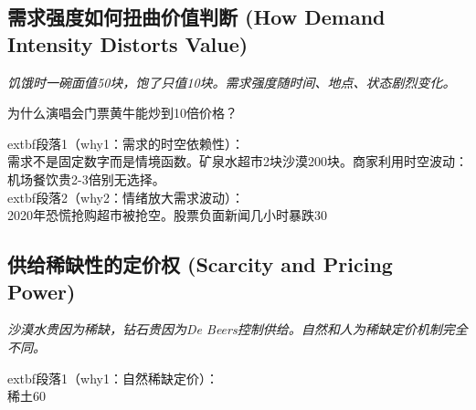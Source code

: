 \documentclass[a4paper,12pt]{book}
\newenvironment{motivation}{\begin{tcolorbox}[colback=gray!10,colframe=gray!60,title=\textit{动机}]\small\itshape}{\end{tcolorbox}}
\newenvironment{questionbox}{\begin{tcolorbox}[colback=red!3,colframe=red!60]}{\end{tcolorbox}}
\begin{document}
	\subsection{需求强度如何扭曲价值判断 (How Demand Intensity Distorts Value)}
	\begin{motivation}饥饿时一碗面值50块，饱了只值10块。需求强度随时间、地点、状态剧烈变化。\end{motivation}
	\begin{questionbox}为什么演唱会门票黄牛能炒到10倍价格？\end{questionbox}
		extbf{段落1（why1：需求的时空依赖性）}：\\需求不是固定数字而是情境函数。矿泉水超市2块沙漠200块。商家利用时空波动：机场餐饮贵2-3倍别无选择。\\	extbf{段落2（why2：情绪放大需求波动）}：\\2020年恐慌抢购超市被抢空。股票负面新闻几小时暴跌30%

	\subsection{供给稀缺性的定价权 (Scarcity and Pricing Power)}
	\begin{motivation}沙漠水贵因为稀缺，钻石贵因为De Beers控制供给。自然和人为稀缺定价机制完全不同。\end{motivation}
		extbf{段落1（why1：自然稀缺定价）}：\\稀土60%
\end{document}
